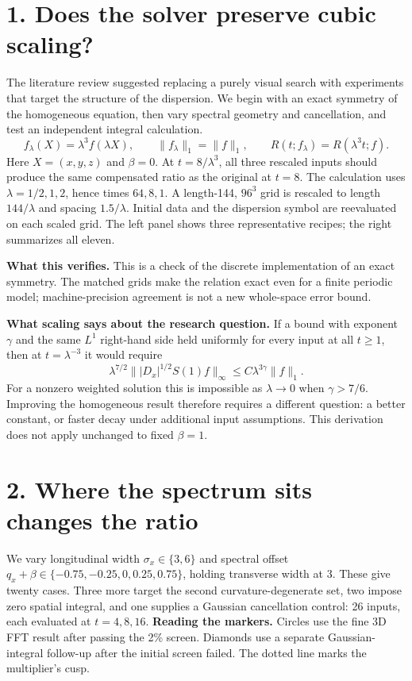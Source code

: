 \newpage

\section*{1. Does the solver preserve cubic scaling?}
The literature review suggested replacing a purely visual search with experiments
that target the structure of the dispersion. We begin with an exact symmetry of
the homogeneous equation, then vary spectral geometry and cancellation, and test
an independent integral calculation.
\[
 f_\lambda(X)=\lambda^3 f(\lambda X),\qquad \|f_\lambda\|_1=\|f\|_1,
 \qquad R(t;f_\lambda)=R(\lambda^3t;f).
\]
Here $X=(x,y,z)$ and $\beta=0$. At $t=8/\lambda^3$, all three rescaled
inputs should produce the same compensated ratio as the original at $t=8$.
The calculation uses $\lambda=1/2,1,2$, hence times $64,8,1$. A length-144,
$96^3$ grid is rescaled to length $144/\lambda$ and spacing $1.5/\lambda$.
Initial data and the dispersion symbol are reevaluated on each scaled grid.
The left panel shows three representative recipes; the right summarizes all eleven.

\textbf{What this verifies.} This is a check of the discrete implementation of an
exact symmetry. The matched grids make the relation exact even for a finite
periodic model; machine-precision agreement is not a new whole-space error bound.

\textbf{What scaling says about the research question.} If a bound with exponent
$\gamma$ and the same $L^1$ right-hand side held uniformly for every input at all
$t\ge1$, then at $t=\lambda^{-3}$ it would require
\[
 \lambda^{7/2}\big\||D_x|^{1/2}S(1)f\big\|_\infty
 \le C\lambda^{3\gamma}\|f\|_1.
\]
For a nonzero weighted solution this is impossible as $\lambda\to0$ when
$\gamma>7/6$. Improving the homogeneous result therefore requires a different
question: a better constant, or faster decay under additional input assumptions.
This derivation does not apply unchanged to fixed $\beta=1$.

\newpage
{}
\section*{2. Where the spectrum sits changes the ratio}
We vary longitudinal width $\sigma_x\in\{3,6\}$ and spectral offset
$q_x+\beta\in\{-0.75,-0.25,0,0.25,0.75\}$, holding transverse width at 3.
These give twenty cases. Three more target the second curvature-degenerate set,
two impose zero spatial integral, and one supplies a Gaussian cancellation control:
26 inputs, each evaluated at $t=4,8,16$.
\textbf{Reading the markers.} Circles use the fine 3D FFT result after passing
the 2\% screen. Diamonds use a separate Gaussian-integral follow-up after the
initial screen failed. The dotted line marks the multiplier's cusp.

